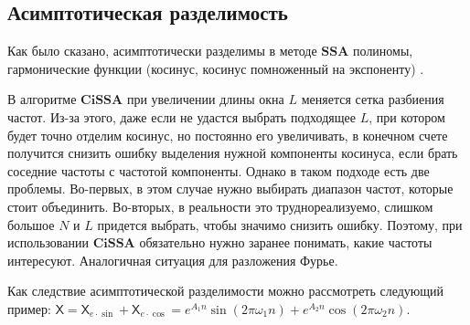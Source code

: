 \documentclass[a4paper, 11pt]{article}
\newcommand{\SSA}{\textbf{SSA}}
\newcommand{\CISSA}{\textbf{CiSSA}}
\newcommand{\TS}{\mathsf{X}}
\begin{document}
\subsection{Асимптотическая разделимость}
\label{subsubsec:asymp}
Как было сказано, асимптотически разделимы в методе $\SSA$ полиномы, гармонические функции (косинус, косинус помноженный на экспоненту) \cite{golyandina2001analysis}.

В алгоритме $\CISSA$ при увеличении длины окна $L$ меняется сетка разбиения частот. Из-за этого, даже если не удастся выбрать подходящее $L$, при котором будет точно отделим косинус, но постоянно его увеличивать, в конечном счете получится снизить ошибку выделения нужной компоненты косинуса, если брать соседние частоты с частотой компоненты. Однако в таком подходе есть две проблемы. Во-первых, в этом случае нужно выбирать диапазон частот, которые стоит объединить. Во-вторых, в реальности это труднореализуемо, слишком большое $N$ и $L$ придется выбрать, чтобы значимо снизить ошибку. Поэтому, при использовании $\CISSA$ обязательно нужно заранее понимать, какие частоты интересуют. Аналогичная ситуация для разложения Фурье.

Как следствие асимптотической разделимости можно рассмотреть следующий пример:
$\TS = \TS_{e\cdot\sin} + \TS_{e\cdot\cos} = e^{A_1 n } \sin(2\pi \omega_1 n ) + e^{A_2 n} \cos(2\pi \omega_2 n )$.
\end{document}
